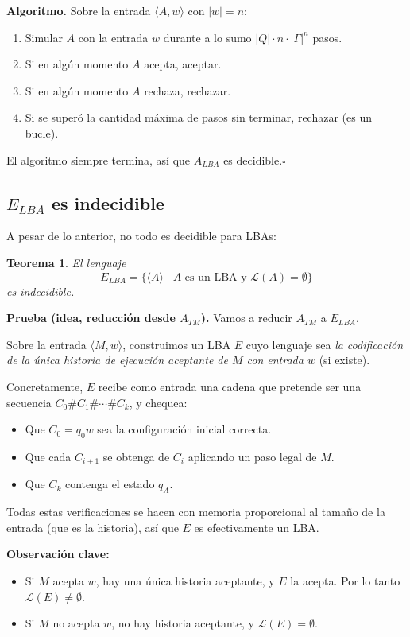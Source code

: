 \documentclass[11pt,a4paper]{article}
\theoremstyle{definicion}
\newtheorem{teorema}[definicion]{Teorema}
\newcommand{\enc}[1]{\langle #1 \rangle}
\newcommand{\Lang}{\mathcal{L}}
\begin{document}
\textbf{Algoritmo.} Sobre la entrada $\enc{A, w}$ con $|w| = n$:
\begin{enumerate}
    \item Simular $A$ con la entrada $w$ durante a lo sumo $|Q| \cdot n \cdot |\Gamma|^n$ pasos.
    \item Si en algún momento $A$ acepta, aceptar.
    \item Si en algún momento $A$ rechaza, rechazar.
    \item Si se superó la cantidad máxima de pasos sin terminar, rechazar (es un bucle).
\end{enumerate}

El algoritmo siempre termina, así que $A_{LBA}$ es decidible.\hfill$\square$

\subsection{$E_{LBA}$ es indecidible}

A pesar de lo anterior, no todo es decidible para LBAs:

\begin{teorema}
El lenguaje
\[
E_{LBA} = \{ \enc{A} \mid A \text{ es un LBA y } \Lang(A) = \emptyset \}
\]
es \emph{indecidible}.
\end{teorema}

\textbf{Prueba (idea, reducción desde $A_{TM}$).} Vamos a reducir $A_{TM}$ a $E_{LBA}$.

Sobre la entrada $\enc{M, w}$, construimos un LBA $E$ cuyo lenguaje sea \emph{la codificación de la única historia de ejecución aceptante de $M$ con entrada $w$} (si existe).

Concretamente, $E$ recibe como entrada una cadena que pretende ser una secuencia $C_0 \# C_1 \# \cdots \# C_k$, y chequea:
\begin{itemize}
    \item Que $C_0 = q_0 w$ sea la configuración inicial correcta.
    \item Que cada $C_{i+1}$ se obtenga de $C_i$ aplicando un paso legal de $M$.
    \item Que $C_k$ contenga el estado $q_A$.
\end{itemize}

Todas estas verificaciones se hacen con memoria proporcional al tamaño de la entrada (que es la historia), así que $E$ es efectivamente un LBA.

\textbf{Observación clave:}
\begin{itemize}
    \item Si $M$ acepta $w$, hay una única historia aceptante, y $E$ la acepta. Por lo tanto $\Lang(E) \neq \emptyset$.
    \item Si $M$ no acepta $w$, no hay historia aceptante, y $\Lang(E) = \emptyset$.
\end{itemize}
\end{document}

